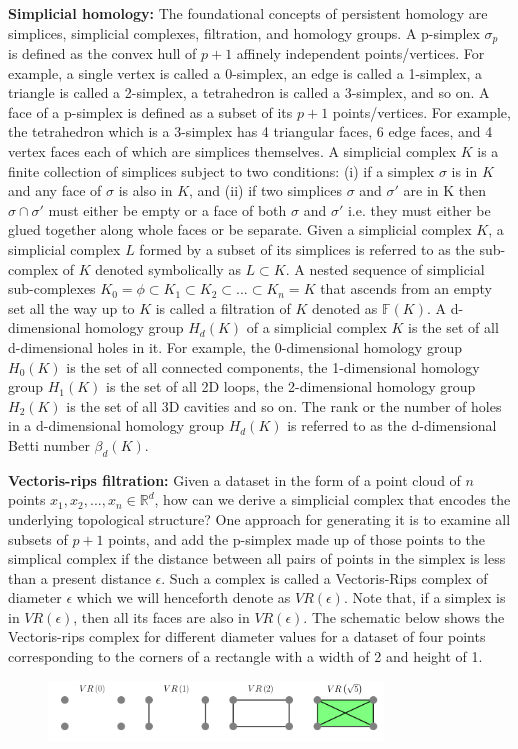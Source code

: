 \documentclass{article}
\begin{document}
\smallskip
\noindent \textbf{Simplicial homology:} The foundational concepts of persistent homology are simplices, simplicial complexes, filtration, and homology groups. A p-simplex $\sigma_p$ is defined as the convex hull of $p+1$ affinely independent points/vertices. For example, a single vertex is called a 0-simplex, an edge is called a 1-simplex, a triangle is called a 2-simplex, a tetrahedron is called a 3-simplex, and so on. A face of a p-simplex is defined as a subset of its $p+1$ points/vertices. For example, the tetrahedron which is a 3-simplex has 4 triangular faces, 6 edge faces, and 4 vertex faces each of which are simplices themselves. A simplicial complex $K$ is a finite collection of simplices subject to two conditions: (i) if a simplex $\sigma$ is in $K$ and any face of $\sigma$ is also in $K$, and (ii) if two simplices $\sigma$ and $\sigma'$ are in K then $\sigma \cap \sigma'$ must either be empty or a face of both $\sigma$ and $\sigma'$ i.e. they must either be glued together along whole faces or be separate. Given a simplicial complex $K$, a simplicial complex $L$ formed by a subset of its simplices is referred to as the sub-complex of $K$ denoted symbolically as $L \subset K$. A nested sequence of simplicial sub-complexes $K_0 = \phi \subset K_1 \subset K_2 \subset ... \subset K_n = K$ that ascends from an empty set all the way up to $K$ is called a filtration of $K$ denoted as $\mathbb{F}(K)$. A d-dimensional homology group $H_d(K)$ of a simplicial complex $K$ is the set of all d-dimensional holes in it. For example, the 0-dimensional homology group $H_0(K)$ is the set of all connected components, the 1-dimensional homology group $H_1(K)$ is the set of all 2D loops, the 2-dimensional homology group $H_2(K)$ is the set of all 3D cavities and so on. The rank or the number of holes in a d-dimensional homology group $H_d(K)$ is referred to as the d-dimensional Betti number $\beta_d(K)$. 

\smallskip
\noindent \textbf{Vectoris-rips filtration:} Given a dataset in the form of a point cloud of $n$ points $x_1, x_2, ..., x_n \in \mathbb{R}^d$, how can we derive a simplicial complex that encodes the underlying topological structure? One approach for generating it is to examine all subsets of $p+1$ points, and add the p-simplex made up of those points to the simplical complex if the distance between all pairs of points in the simplex is less than a present distance $\epsilon$. Such a complex is called a Vectoris-Rips complex of diameter $\epsilon$ which we will henceforth denote as $VR(\epsilon)$. Note that, if a simplex is in $VR(\epsilon)$, then all its faces are also in $VR(\epsilon)$. The schematic below shows the Vectoris-rips complex for different diameter values for a dataset of four points corresponding to the corners of a rectangle with a width of 2 and height of 1.
\vspace{-0.2cm}
%
\begin{figure}[!h]
\centering
\includegraphics[width=3.5in]{figures/vrcomplex-diagram.png}
\end{figure}
%
\end{document}
